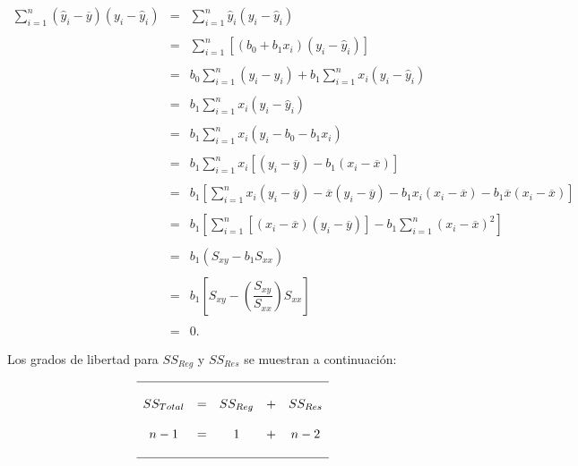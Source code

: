 $$
\begin{array}{rcl}
    \displaystyle\sum_{i=1}^n \left(\hat{y}_i-\overline{y}\right)\left(y_i-\hat{y}_i\right) &=& \displaystyle\sum_{i=1}^n \hat{y}_i\left(y_i-\hat{y}_i\right)\\\\
											    &=& \displaystyle\sum_{i=1}^n \left[\left(b_0+b_1x_i\right)\left(y_i-\hat{y}_i\right)\right]\\\\
											    &=& b_0\displaystyle\sum_{i=1}^n \left(y_i-\hat{y}_i\right)+b_1\displaystyle\sum_{i=1}^n x_i\left(y_i-\hat{y}_i\right)\\\\
											    &=& b_1\displaystyle\sum_{i=1}^n x_i\left(y_i-\hat{y}_i\right)\\\\
											    &=& b_1\displaystyle\sum_{i=1}^n x_i\left(y_i-b_0-b_1x_i\right)\\\\
											    &=& b_1\displaystyle\sum_{i=1}^n x_i\left[\left(y_i-\overline{y}\right)-b_1\left(x_i-\overline{x}\right)\right]\\\\
											    &=& b_1\left[\displaystyle\sum_{i=1}^n x_i\left(y_i-\overline{y}\right)-\overline{x}\left(y_i-\overline{y}\right)-b_1x_i\left(x_i-\overline{x}\right)-b_1\overline{x}\left(x_i-\overline{x}\right)\right]\\\\
											    &=& b_1\left[\displaystyle\sum_{i=1}^n\left[\left(x_i-\overline{x}\right)\left(y_i-\overline{y}\right)\right]-b_1 \displaystyle\sum_{i=1}^n \left(x_i-\overline{x}\right)^2\right]\\\\
											    &=& b_1\left(S_{xy}-b_1S_{xx}\right)\\\\
											    &=& b_1\left[S_{xy}-\left(\dfrac{S_{xy}}{S_{xx}}\right)S_{xx}\right]\\\\
											    &=& 0.
\end{array}
$$

Los grados de libertad para $SS_{Reg}$ y $SS_{Res}$ se muestran a continuación:

$$
\begin{array}{ccccc}
    \hline\\
    SS_{Total} & = & SS_{Reg} & + & SS_{Res}\\\\
    n-1 & = & 1 & + & n-2\\\\
    \hline
\end{array}
$$


